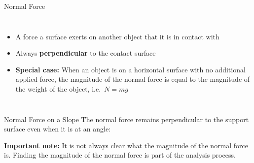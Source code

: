 \documentclass[12pt,compress,aspectratio=169]{beamer}
\begin{document}
\begin{frame}{Normal Force}
  \begin{columns}
    \centering
    
    \begin{itemize}
    \item A force a surface exerts on another object that it is in contact with
    \item Always \textbf{perpendicular} to the contact surface
    \item\textbf{Special case:} When an object is on a horizontal surface
      with no additional applied force, the magnitude of the normal force is
      equal to the magnitude of the weight of the object, i.e.\ $N=mg$
    \end{itemize}
  \end{columns}
\end{frame}



\begin{frame}{Normal Force on a Slope}
  The normal force remains perpendicular to the support surface even when it is
  at an angle:
  \begin{center}
  \end{center}
  \textbf{Important note:} It is not always clear what the magnitude of the
  normal force is. Finding the magnitude of the normal force is part of the
  analysis process.
\end{frame}
\end{document}
